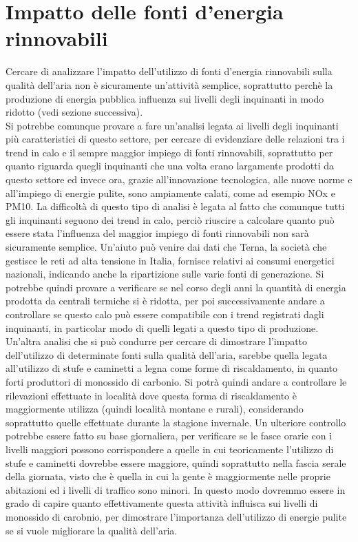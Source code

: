 \documentclass{article}
\begin{document}
\section{Impatto delle fonti d'energia rinnovabili}
Cercare di analizzare l'impatto dell'utilizzo di fonti d'energia rinnovabili sulla qualità dell'aria non è sicuramente un'attività semplice, soprattutto perchè la produzione di energia pubblica influenza sui livelli degli inquinanti in modo ridotto (vedi sezione successiva).
\\Si potrebbe comunque provare a fare un'analisi legata ai livelli degli inquinanti più caratteristici di questo settore, per cercare di evidenziare delle relazioni tra i trend in calo e il sempre maggior impiego di fonti rinnovabili, soprattutto per quanto riguarda quegli inquinanti che una volta erano largamente prodotti da questo settore ed invece ora, grazie all'innovazione tecnologica, alle nuove norme e all'impiego di energie pulite, sono ampiamente calati, come ad esempio NOx e PM10. La difficoltà di questo tipo di analisi è legata al fatto che comunque tutti gli inquinanti seguono dei trend in calo, perciò riuscire a calcolare quanto può essere stata l'influenza del maggior impiego di fonti rinnovabili non sarà sicuramente semplice. Un'aiuto può venire dai dati che Terna, la società che gestisce le reti ad alta tensione in Italia, fornisce relativi ai consumi energetici nazionali, indicando anche la ripartizione sulle varie fonti di generazione. Si potrebbe quindi provare a verificare se nel corso degli anni la quantità di energia prodotta da centrali termiche si è ridotta, per poi successivamente andare a controllare se questo calo può essere compatibile con i trend registrati dagli inquinanti, in particolar modo di quelli legati a questo tipo di produzione.
\\Un'altra analisi che si può condurre per cercare di dimostrare l'impatto dell'utilizzo di determinate fonti sulla qualità dell'aria, sarebbe quella legata all'utilizzo di stufe e caminetti a legna come forme di riscaldamento, in quanto forti produttori di monossido di carbonio. Si potrà quindi andare a controllare le rilevazioni effettuate in località dove questa forma di riscaldamento è maggiormente utilizza (quindi località montane e rurali), considerando soprattutto quelle effettuate durante la stagione invernale. Un ulteriore controllo potrebbe essere fatto su base giornaliera, per verificare se le fasce orarie con i livelli maggiori possono corrispondere a quelle in cui teoricamente l'utilizzo di stufe e caminetti dovrebbe essere maggiore, quindi soprattutto nella fascia serale della giornata, visto che è quella in cui la gente è maggiormente nelle proprie abitazioni ed i livelli di traffico sono minori. In questo modo dovremmo essere in grado di capire quanto effettivamente questa attività influisca sui livelli di monossido di carobnio, per dimostrare l'importanza dell'utilizzo di energie pulite se si vuole migliorare la qualità dell'aria.
\end{document}
